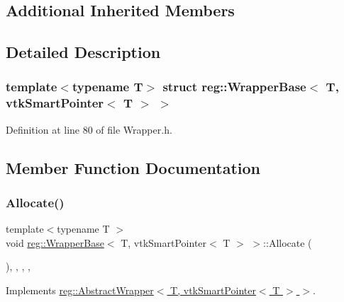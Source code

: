 \subsection*{Additional Inherited Members}


\subsection{Detailed Description}
\subsubsection*{template$<$typename T$>$\newline
struct reg\+::\+Wrapper\+Base$<$ T, vtk\+Smart\+Pointer$<$ T $>$ $>$}



Definition at line 80 of file Wrapper.\+h.



\subsection{Member Function Documentation}
\mbox{\label{structreg_1_1_wrapper_base_3_01_t_00_01vtk_smart_pointer_3_01_t_01_4_01_4_a3b2609bc1666d9f2dbfe789100889bdc}} 
\subsubsection{\texorpdfstring{Allocate()}{Allocate()}}
{\footnotesize\ttfamily template$<$typename T $>$ \\
void \hyperlink{structreg_1_1_wrapper_base}{reg\+::\+Wrapper\+Base}$<$ T, vtk\+Smart\+Pointer$<$ T $>$ $>$\+::Allocate (\begin{DoxyParamCaption}{ }\end{DoxyParamCaption})\hspace{0.3cm}{\ttfamily [inline]}, {\ttfamily [override]}, {\ttfamily [protected]}, {\ttfamily [virtual]}, {\ttfamily [noexcept]}}



Implements \hyperlink{structreg_1_1_abstract_wrapper_aad461ca147a0a7fcfd4f8662994742f3}{reg\+::\+Abstract\+Wrapper$<$ T, vtk\+Smart\+Pointer$<$ T $>$ $>$}.



